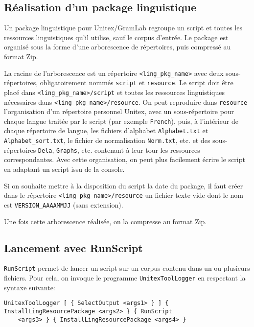 \subsection{Réalisation d'un package linguistique}
\label{section-creation}

Un package linguistique pour Unitex/GramLab regroupe un script et toutes les ressources linguistiques
qu'il utilise, sauf le corpus d'entrée. Le package est organisé sous la forme d'une arborescence
de répertoires, puis compressé au format Zip.

\bigskip     {}
\noindent La racine de l'arborescence est un répertoire \verb$<ling_pkg_name>$ avec deux
sous-répertoires, obligatoirement nommés \verb$script$ et \verb$resource$. Le script doit être placé
dans \verb$<ling_pkg_name>/script$ et toutes les ressources linguistiques nécessaires dans
\verb$<ling_pkg_name>/resource$. On peut reproduire dans \verb$resource$ l'organisation d'un
répertoire personnel Unitex, avec un sous-répertoire pour chaque langue traitée par le script
(par exemple \verb$French$), puis, à l'intérieur de chaque répertoire de langue, les fichiers d'alphabet
\verb$Alphabet.txt$ et \verb$Alphabet_sort.txt$, le fichier de normalisation \verb$Norm.txt$, etc. et
des sous-répertoires \verb$Dela$, \verb$Graphs$, etc. contenant à leur tour les ressources
correspondantes. Avec cette organisation, on peut plus facilement écrire le script en adaptant un script
issu de la console.

\bigskip
\noindent Si on souhaite mettre à la disposition du script la date du package, il faut créer dans le
répertoire \verb$<ling_pkg_name>/resource$ un fichier texte vide dont le nom est
\verb$VERSION_AAAAMMJJ$ (sans extension).

\bigskip
\noindent Une fois cette arborescence réalisée, on la compresse au format Zip.

\subsection{Lancement avec RunScript}
\label{section-runscript}
\verb$RunScript$ permet de lancer un script sur un corpus contenu dans un ou plusieurs fichiers.
Pour cela, on invoque le programme \verb$UnitexToolLogger$ en respectant la syntaxe suivante:

\begin{Verbatim}[fontsize=\small,fontfamily=helvetica]
UnitexToolLogger [ { SelectOutput <args1> } ] { InstallLingResourcePackage <args2> } { RunScript
    <args3> } { InstallLingResourcePackage <args4> }
\end{Verbatim}


